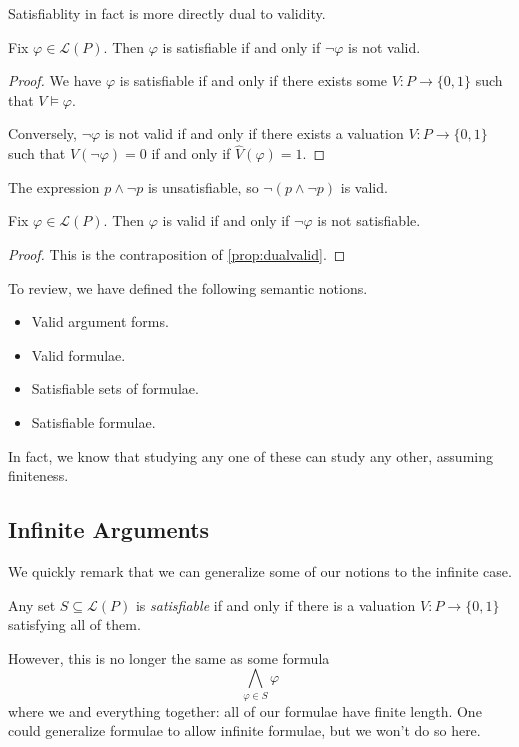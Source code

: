 Satisfiablity in fact is more directly dual to validity.
\begin{proposition} \label{prop:dualvalid}
	Fix $\varphi\in\mathcal L(P)$. Then $\varphi$ is satisfiable if and only if $\lnot\varphi$ is not valid.
\end{proposition}
\begin{proof}
	We have $\varphi$ is satisfiable if and only if there exists some $V:P\to\{0,1\}$ such that $V\models\varphi$.

	Conversely, $\lnot\varphi$ is not valid if and only if there exists a valuation $V:P\to\{0,1\}$ such that $\hat V(\lnot\varphi)=0$ if and only if $\hat V(\varphi)=1$.
\end{proof}
\begin{example}
	The expression $p\land\lnot p$ is unsatisfiable, so $\lnot(p\land\lnot p)$ is valid.
\end{example}
\begin{corollary}
	Fix $\varphi\in\mathcal L(P)$. Then $\varphi$ is valid if and only if $\lnot\varphi$ is not satisfiable.
\end{corollary}
\begin{proof}
	This is the contraposition of \autoref{prop:dualvalid}.
\end{proof}
To review, we have defined the following semantic notions.
\begin{itemize}
	\item Valid argument forms.
	\item Valid formulae.
	\item Satisfiable sets of formulae.
	\item Satisfiable formulae.
\end{itemize}
In fact, we know that studying any one of these can study any other, assuming finiteness.

\subsection{Infinite Arguments}
We quickly remark that we can generalize some of our notions to the infinite case.
\begin{definition}[Satisfiable]
	Any set $S\subseteq\mathcal L(P)$ is \textit{satisfiable} if and only if there is a valuation $V:P\to\{0,1\}$ satisfying all of them.
\end{definition}
However, this is no longer the same as some formula
\[\bigwedge_{\varphi\in S}\varphi\]
where we and everything together: all of our formulae have finite length. One could generalize formulae to allow infinite formulae, but we won't do so here.

